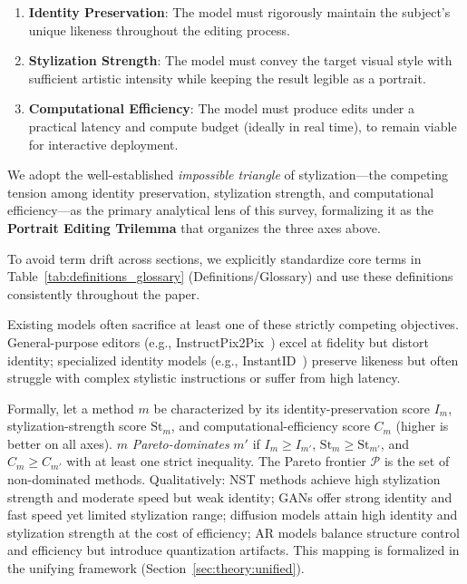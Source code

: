 \documentclass[journal]{IEEEtran}
\begin{document}
\begin{enumerate}
  \item \textbf{Identity Preservation}: The model must rigorously maintain the subject's unique likeness throughout the editing process.
  \item \textbf{Stylization Strength}: The model must convey the target visual style with sufficient artistic intensity while keeping the result legible as a portrait.
  \item \textbf{Computational Efficiency}: The model must produce edits under a practical latency and compute budget (ideally in real time), to remain viable for interactive deployment.
\end{enumerate}

We adopt the well-established \emph{impossible triangle} of stylization---the competing tension among identity preservation, stylization strength, and computational efficiency---as the primary analytical lens of this survey, formalizing it as the \textbf{Portrait Editing Trilemma} that organizes the three axes above.

To avoid term drift across sections, we explicitly standardize core terms in Table~\ref{tab:definitions_glossary} (Definitions/Glossary) and use these definitions consistently throughout the paper.

Existing models often sacrifice at least one of these strictly competing objectives. General-purpose editors (e.g., InstructPix2Pix~\cite{brooks2023instructpix2pix}) excel at fidelity but distort identity; specialized identity models (e.g., InstantID~\cite{wang2024instantid}) preserve likeness but often struggle with complex stylistic instructions or suffer from high latency.

Formally, let a method $m$ be characterized by its identity-preservation score $I_m$, stylization-strength score $\mathrm{St}_m$, and computational-efficiency score $C_m$ (higher is better on all axes). $m$ \emph{Pareto-dominates} $m'$ if $I_m \ge I_{m'}$, $\mathrm{St}_m \ge \mathrm{St}_{m'}$, and $C_m \ge C_{m'}$ with at least one strict inequality. The Pareto frontier $\mathcal{P}$ is the set of non-dominated methods. Qualitatively: NST methods achieve high stylization strength and moderate speed but weak identity; GANs offer strong identity and fast speed yet limited stylization range; diffusion models attain high identity and stylization strength at the cost of efficiency; AR models balance structure control and efficiency but introduce quantization artifacts. This mapping is formalized in the unifying framework (Section~\ref{sec:theory:unified}).
\end{document}
